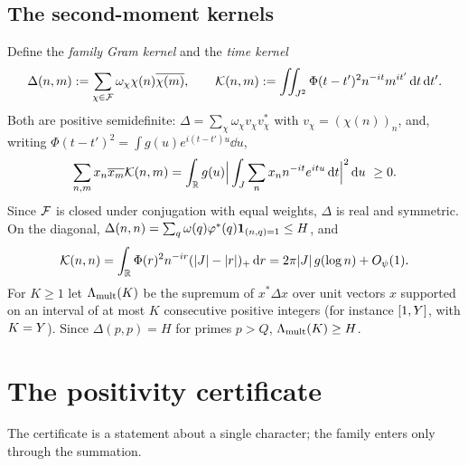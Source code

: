 \documentclass[11pt]{amsart}
\theoremstyle{definition}
\theoremstyle{remark}
\numberwithin{equation}{section}
\begin{document}
\subsection{The second-moment kernels}\label{sec:kernels}
Define the \emph{family Gram kernel} and the \emph{time kernel}
\begin{equation}\label{eq:Delta}
\Delta(n,m):=\sum_{\chi\in\mathcal F}\omega_\chi\chi(n)\overline{\chi(m)},\qquad
\mathcal K(n,m):=\iint_{J^2}\Phi(t-t')^2n^{-it}m^{it'}\,\mathrm d t\,\mathrm d t'.
\end{equation}
Both are positive semidefinite: $\Delta=\sum_\chi\omega_\chi v_\chi v_\chi^*$ with $v_\chi=(\chi(n))_n$, and, writing $\Phi(t-t')^2=\int g(u)e^{i(t-t')u}\dd u$,
\begin{equation}\label{eq:Kpsd}
\sum_{n,m}x_n\overline{x_m}\mathcal K(n,m)=\int_\mathbb R g(u)\Big|\int_J\sum_nx_nn^{-it}e^{itu}\,\mathrm d t\Big|^2\,\mathrm d u\ \ge0 .
\end{equation}
Since $\mathcal F$ is closed under conjugation with equal weights, $\Delta$ is real and symmetric. On the diagonal, $\Delta(n,n)=\sum_q\omega(q)\varphi^*(q)\mathbf 1_{(n,q)=1}\le H$, and
\begin{equation}\label{eq:Kdiag}
\mathcal K(n,n)=\int_\mathbb R\Phi(r)^2n^{-ir}(|J|-|r|)_+\,\mathrm d r=2\pi|J|\,g(\log n)+O_\psi(1).
\end{equation}
For $K\ge1$ let $\Lambda_{\mathrm{mult}}(K)$ be the supremum of $x^*\Delta x$ over unit vectors $x$ supported on an interval of at most $K$ consecutive positive integers (for instance $[1,Y]$, with $K=Y$). Since $\Delta(p,p)=H$ for primes $p>Q$, $\Lambda_{\mathrm{mult}}(K)\ge H$.

\section{The positivity certificate}\label{sec:certificate}

The certificate is a statement about a single character; the family enters only through the summation.
\end{document}

